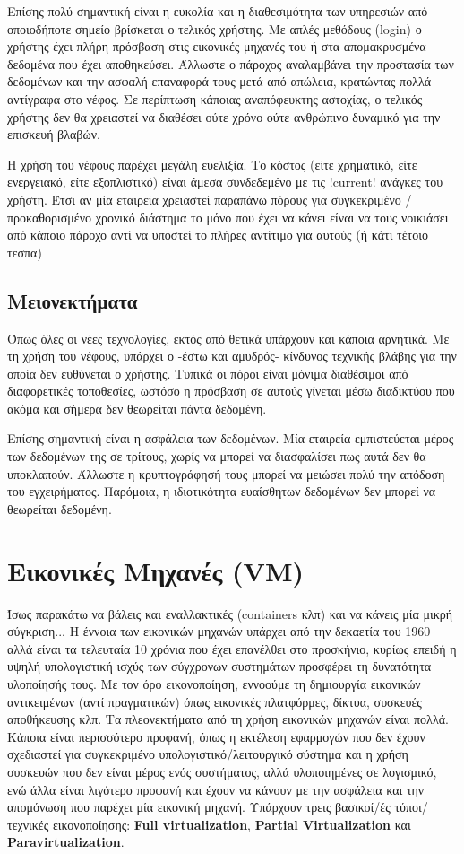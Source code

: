 Επίσης πολύ σημαντική είναι η ευκολία και η διαθεσιμότητα των υπηρεσιών από
οποιοδήποτε σημείο βρίσκεται ο τελικός χρήστης. Με απλές μεθόδους (login) ο
χρήστης έχει πλήρη πρόσβαση στις εικονικές μηχανές του ή στα απομακρυσμένα
δεδομένα που έχει αποθηκεύσει. Άλλωστε ο πάροχος αναλαμβάνει την προστασία των
δεδομένων και την ασφαλή επαναφορά τους μετά από απώλεια, κρατώντας πολλά αντίγραφα
στο νέφος. Σε περίπτωση κάποιας αναπόφευκτης αστοχίας, ο τελικός χρήστης δεν
θα χρειαστεί να διαθέσει ούτε χρόνο ούτε ανθρώπινο δυναμικό για την επισκευή
βλαβών.

Η χρήση του νέφους παρέχει μεγάλη ευελιξία. Το κόστος (είτε χρηματικό, είτε
ενεργειακό, είτε εξοπλιστικό) είναι άμεσα συνδεδεμένο με τις !current! ανάγκες
του χρήστη. Έτσι αν μία εταιρεία χρειαστεί παραπάνω πόρους για συγκεκριμένο /
προκαθορισμένο χρονικό διάστημα το μόνο που έχει να κάνει είναι να τους
νοικιάσει από κάποιο πάροχο αντί να υποστεί το πλήρες αντίτιμο για αυτούς (ή
κάτι τέτοιο τεσπα)

\subsection{Μειονεκτήματα}
Όπως όλες οι νέες τεχνολογίες, εκτός από θετικά υπάρχουν και κάποια αρνητικά. Με
τη χρήση του νέφους, υπάρχει ο -έστω και αμυδρός- κίνδυνος τεχνικής βλάβης για
την οποία δεν ευθύνεται ο χρήστης. Τυπικά οι πόροι είναι μόνιμα διαθέσιμοι
από διαφορετικές τοποθεσίες, ωστόσο η πρόσβαση σε αυτούς γίνεται μέσω
διαδικτύου που ακόμα και σήμερα δεν θεωρείται πάντα δεδομένη.

Επίσης σημαντική είναι η ασφάλεια των δεδομένων. Μία εταιρεία εμπιστεύεται μέρος
των δεδομένων της σε τρίτους, χωρίς να μπορεί να διασφαλίσει πως αυτά δεν θα
υποκλαπούν. Άλλωστε η κρυπτογράφησή τους μπορεί να μειώσει πολύ την απόδοση του
εγχειρήματος. Παρόμοια, η ιδιοτικότητα ευαίσθητων δεδομένων δεν μπορεί να
θεωρείται δεδομένη.

\section{Εικονικές Μηχανές (VM)}
Ίσως παρακάτω να βάλεις και εναλλακτικές (containers κλπ) και να κάνεις μία
μικρή σύγκριση...
Η έννοια των εικονικών μηχανών υπάρχει από την δεκαετία του 1960 αλλά είναι τα
τελευταία 10 χρόνια που έχει επανέλθει στο προσκήνιο, κυρίως επειδή η υψηλή
υπολογιστική ισχύς των σύγχρονων συστημάτων προσφέρει τη δυνατότητα υλοποίησής
τους. Με τον όρο εικονοποίηση, εννοούμε τη δημιουργία εικονικών αντικειμένων
(αντί πραγματικών) όπως εικονικές πλατφόρμες, δίκτυα, συσκευές αποθήκευσης κλπ.
Τα πλεονεκτήματα από τη χρήση εικονικών μηχανών είναι πολλά. Κάποια είναι
περισσότερο  προφανή, όπως η εκτέλεση εφαρμογών που δεν έχουν σχεδιαστεί για
συγκεκριμένο υπολογιστικό/λειτουργικό σύστημα και η χρήση συσκευών που δεν είναι
μέρος ενός συστήματος, αλλά υλοποιημένες σε λογισμικό, ενώ άλλα είναι λιγότερο
προφανή και έχουν να κάνουν με την ασφάλεια και την απομόνωση που παρέχει μία
εικονική μηχανή.
Υπάρχουν τρεις βασικοί/ές τύποι/τεχνικές εικονοποίησης: \textbf{Full
virtualization}, \textbf{Partial Virtualization} και \textbf{Paravirtualization}.

